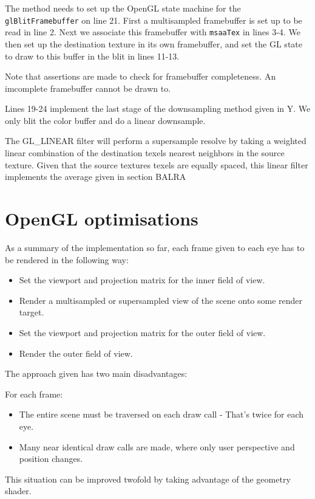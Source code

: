 \documentclass[12pt,a4paper,twoside,openright]{report}
\begin{document}
The method needs to set up the OpenGL state machine for the \texttt{glBlitFramebuffer} on line 21. First a multisampled framebuffer is set up to be read in line 2. Next we associate this framebuffer with \texttt{msaaTex} in lines 3-4. 
We then set up the destination texture in its own framebuffer, and set the GL state to draw to this buffer in the blit in lines 11-13.

Note that assertions are made to check for framebuffer completeness. An imcomplete framebuffer cannot be drawn to.

Lines 19-24 implement the last stage of the downsampling method given in Y. We only blit the color buffer and do a linear downsample. 

The GL\_LINEAR filter will perform a supersample resolve by taking a weighted linear combination of the destination texels nearest neighbors in the source texture. Given that the source textures texels are equally spaced, this linear filter implements the average given in section BALRA

\section{OpenGL optimisations}

As a summary of the implementation so far, each frame given to each eye has to be rendered in the following way:

\begin{itemize}
  \item Set the viewport and projection matrix for the inner field of view.
  \item Render a multisampled or supersampled view of the scene onto some render target.
  \item Set the viewport and projection matrix for the outer field of view.
  \item Render the outer field of view.
\end{itemize}
The approach given has two main disadvantages:

For each frame:
\begin{itemize}
  \item The entire scene must be traversed on each draw call - That's twice for each eye.
  \item Many near identical draw calls are made, where only user perspective and position changes.
\end{itemize}

This situation can be improved twofold by taking advantage of the geometry shader.
\end{document}

